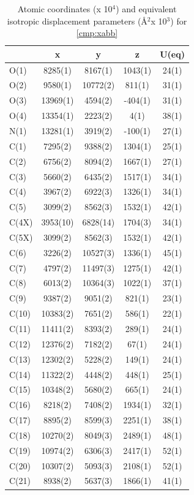 \pagebreak
\twocolumn

\begin{table}[h]
\centering
\caption{Atomic coordinates (x 10$^4$) and equivalent isotropic displacement parameters (\AA$^2$x
10$^3$) for \ref{cmp:xabb}}
{\footnotesize
\begin{tabular}{lcccc} 
\\
\toprule
& x & y & z & U(eq) \\
\midrule
O(1)&8285(1)&8167(1)&1043(1)&24(1)\\
O(2)&9580(1)&10772(2)&811(1)&31(1)\\
O(3)&13969(1)&4594(2)&-404(1)&31(1)\\
O(4)&13354(1)&2223(2)&4(1)&38(1)\\
N(1)&13281(1)&3919(2)&-100(1)&27(1)\\
C(1)&7295(2)&9388(2)&1304(1)&25(1)\\
C(2)&6756(2)&8094(2)&1667(1)&27(1)\\
C(3)&5660(2)&6435(2)&1517(1)&34(1)\\
C(4)&3967(2)&6922(3)&1326(1)&34(1)\\
C(5)&3099(2)&8562(3)&1532(1)&42(1)\\
C(4X)&3953(10)&6828(14)&1704(3)&34(1)\\
C(5X)&3099(2)&8562(3)&1532(1)&42(1)\\
C(6)&3226(2)&10527(3)&1336(1)&45(1)\\
C(7)&4797(2)&11497(3)&1275(1)&42(1)\\
C(8)&6013(2)&10364(3)&1022(1)&37(1)\\
C(9)&9387(2)&9051(2)&821(1)&23(1)\\
C(10)&10383(2)&7651(2)&586(1)&22(1)\\
C(11)&11411(2)&8393(2)&289(1)&24(1)\\
C(12)&12376(2)&7182(2)&67(1)&24(1)\\
C(13)&12302(2)&5228(2)&149(1)&24(1)\\
C(14)&11322(2)&4448(2)&448(1)&25(1)\\
C(15)&10348(2)&5680(2)&665(1)&24(1)\\
C(16)&8218(2)&7408(2)&1934(1)&32(1)\\
C(17)&8895(2)&8599(3)&2251(1)&38(1)\\
C(18)&10270(2)&8049(3)&2489(1)&48(1)\\
C(19)&10974(2)&6306(3)&2417(1)&52(1)\\
C(20)&10307(2)&5093(3)&2108(1)&52(1)\\
C(21)&8938(2)&5637(3)&1866(1)&41(1)\\
\bottomrule
\end{tabular}
}
\end{table} 

